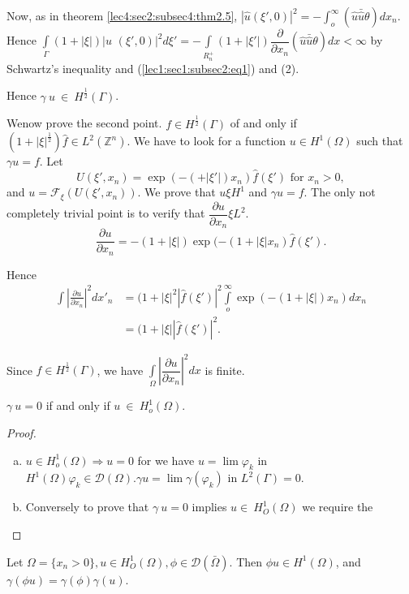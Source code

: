   Now, as in theorem \ref{lec4:sec2:subsec4:thm2.5}, $|\hat{u}(\xi',0)|^2=- \int _o
  ^\infty (\hat{u}\bar{\hat{u}}\theta)dx_n$. Hence  $\int\limits
  _\Gamma (1+ |\xi|)|\hat{u}$ $(\xi', 0)|^2 d \xi '= -
  \int\limits _{R^+_n}(1+ |\xi'|) \dfrac{\partial}{\partial
    x_n}(\hat{u} \bar{\hat{u}}\theta) dx < \infty $ by Schwartz's
  inequality and (\ref{lec1:sec1:subsec2:eq1}) and (2).  
  
Hence $\gamma~ u~ \in ~H^{\frac{1}{2}}(\Gamma)$.
 
  We\pageoriginale now prove the second point. $f \in
  H^{\frac{1}{2}}(\Gamma)$ of and only if $(1 +
  |\xi|^{\frac{1}{2}}) \hat{f} \in L^2(\mathbb{Z}^n)$. We
  have to look for a function $u \in H^1(\Omega)$ such that
  $\gamma u =f$. Let  
$$
U(\xi',x_n)=\exp (-(+|\xi'|)x_n) \hat{f}(\xi')
\text{ for } x_n > 0, 
$$
and $u = \mathscr{F}_{\xi}(U(\xi',x_n))$. We prove
that $u \xi H^1$ and $\gamma u =f$. The only not completely
trivial point is to verify that $\dfrac{ \partial u}{\partial x_n}
\xi L^2$.  
$$
\frac{ \partial u}{\partial x_n} = -(1+|\xi|) \exp
(-(1+|\xi|x_n) \hat{f}(\xi'). 
$$

Hence 
\begin{align*}
\int | \frac{ \partial u}{\partial x_n}|^2 dx'_n & =
(1+|\xi|^2|\hat{f}(\xi')|^2 \int \limits^{\infty}_{o}
\exp (-(1+|\xi|)x_n)dx_n\\ 
& = (1+|\xi||\hat{f}(\xi')|^2.
\end{align*}

Since $f \in H^{\frac{1}{2}} (\Gamma)$, we have $ \int
\limits_{\Omega}|\dfrac{ \partial u}{\partial x_n}|^2 dx $ is finite. 

\begin{theorem}\label{lec4:sec2:subsec4:thm2.7}%
  $\gamma~ u  = 0$ if and only if $u~ \in~ H^1_o (\Omega)$.
\end{theorem}
\begin{proof}
    \begin{enumerate}[(a)]
    \item $ u \in H^1_o (\Omega) \Longrightarrow u =0$ for we
      have $u = \lim \varphi_k$ in $H^1 (\Omega) \varphi_k
      \in \mathscr{D}(\Omega). \gamma u = \lim \gamma
      (\varphi_k) $ in $L^2 (\Gamma)=0$.   
    \item Conversely to prove that $\gamma~ u = 0$ implies $u \in~
      H^1_O (\Omega)$ we require the  
\end{enumerate}
\end{proof}

\begin{lemma*}%
  Let $\Omega = \{ x_n > 0 \}, u \in H^1_O (\Omega), \phi
  \in \mathscr{D}(\bar{\Omega})$. Then $\phi u \in H^1
  (\Omega)$, and $\gamma(\phi u) = \gamma(\phi) \gamma(u)$. 
\end{lemma*}

